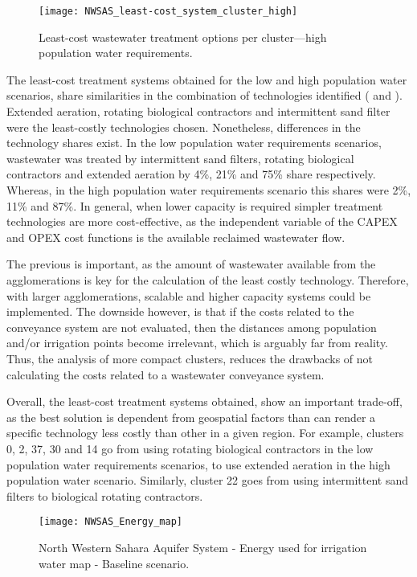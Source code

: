 \begin{figure}[!ht]
	\centering
	\texttt{[image: NWSAS\_least-cost\_system\_cluster\_high]}
	\caption{Least-cost wastewater treatment options per cluster---high population water requirements.}
	\label{fig:leastHigh}
\end{figure}

The least-cost treatment systems obtained for the low and high population water scenarios, share similarities in the combination of technologies identified ( and ). Extended aeration, rotating biological contractors and intermittent sand filter were the least-costly technologies chosen. Nonetheless, differences in the technology shares exist. In the low population water requirements scenarios, wastewater was treated by intermittent sand filters, rotating biological contractors and extended aeration by 4\%, 21\% and 75\% share respectively. Whereas, in the high population water requirements scenario this shares were 2\%, 11\% and 87\%. In general, when lower capacity is required simpler treatment technologies are more cost-effective, as the independent variable of the CAPEX and OPEX cost functions is the available reclaimed wastewater flow.

The previous is important, as the amount of wastewater available from the agglomerations is key for the calculation of the least costly technology. Therefore, with larger agglomerations, scalable and higher capacity systems could be implemented. The downside however, is that if the costs related to the conveyance system are not evaluated, then the distances among population and/or irrigation points become irrelevant, which is arguably far from reality. Thus, the analysis of more compact clusters, reduces the drawbacks of not calculating the costs related to a wastewater conveyance system.

Overall, the least-cost treatment systems obtained, show an important trade-off, as the best solution is dependent from geospatial factors than can render a specific technology less costly than other in a given region. For example, clusters 0, 2, 37, 30 and 14 go from using rotating biological contractors in the low population water requirements scenarios, to use extended aeration in the high population water scenario. Similarly, cluster 22 goes from using intermittent sand filters to biological rotating contractors.

\begin{figure}[!b]
	\centering
	\texttt{[image: NWSAS\_Energy\_map]}
	\caption[NWSAS energy used for irrigation water map - Baseline scenario]{North Western Sahara Aquifer System - Energy used for irrigation water map - Baseline scenario.}
	\label{fig:energy_map}
\end{figure}

